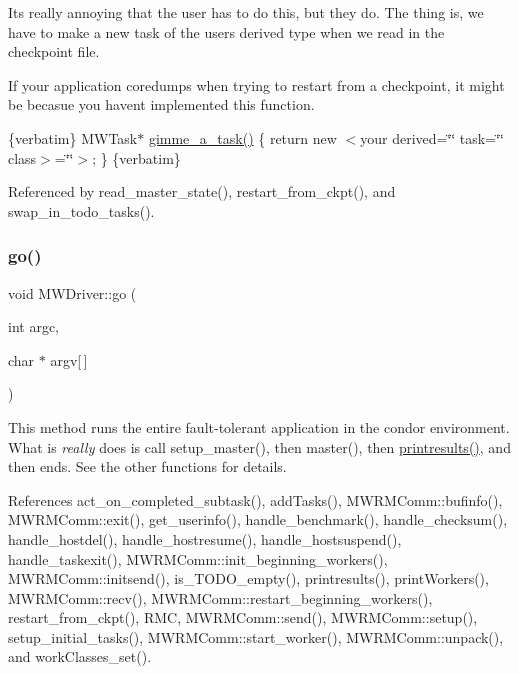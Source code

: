 It\textquotesingle{}s really annoying that the user has to do this, but they do. The thing is, we have to make a new task of the user\textquotesingle{}s derived type when we read in the checkpoint file.

If your application coredumps when trying to restart from a checkpoint, it might be becasue you haven\textquotesingle{}t implemented this function.

\{verbatim\} M\+W\+Task$\ast$ \hyperlink{classMWDriver_a7d37eab370800bcc1fed37bff6c92643}{gimme\+\_\+a\+\_\+task()} \{ return new $<$your derived=\char`\"{}\char`\"{} task=\char`\"{}\char`\"{} class$>$=\char`\"{}\char`\"{}$>$; \} \{verbatim\} 

Referenced by read\+\_\+master\+\_\+state(), restart\+\_\+from\+\_\+ckpt(), and swap\+\_\+in\+\_\+todo\+\_\+tasks().

\mbox{\label{classMWDriver_a7e9140329e1c6a2b4b7f1a0a9a365cab}} 
\subsubsection{\texorpdfstring{go()}{go()}\hspace{0.1cm}{\footnotesize\ttfamily [1/2]}}
{\footnotesize\ttfamily void M\+W\+Driver\+::go (\begin{DoxyParamCaption}\item[{int}]{argc,  }\item[{char $\ast$}]{argv\mbox{[}$\,$\mbox{]} }\end{DoxyParamCaption})}

This method runs the entire fault-\/tolerant application in the condor environment. What is {\itshape really} does is call setup\+\_\+master(), then master(), then \hyperlink{classMWDriver_a147074c64c2bf0883077a28432816947}{printresults()}, and then ends. See the other functions for details. 

References act\+\_\+on\+\_\+completed\+\_\+subtask(), add\+Tasks(), M\+W\+R\+M\+Comm\+::bufinfo(), M\+W\+R\+M\+Comm\+::exit(), get\+\_\+userinfo(), handle\+\_\+benchmark(), handle\+\_\+checksum(), handle\+\_\+hostdel(), handle\+\_\+hostresume(), handle\+\_\+hostsuspend(), handle\+\_\+taskexit(), M\+W\+R\+M\+Comm\+::init\+\_\+beginning\+\_\+workers(), M\+W\+R\+M\+Comm\+::initsend(), is\+\_\+\+T\+O\+D\+O\+\_\+empty(), printresults(), print\+Workers(), M\+W\+R\+M\+Comm\+::recv(), M\+W\+R\+M\+Comm\+::restart\+\_\+beginning\+\_\+workers(), restart\+\_\+from\+\_\+ckpt(), R\+MC, M\+W\+R\+M\+Comm\+::send(), M\+W\+R\+M\+Comm\+::setup(), setup\+\_\+initial\+\_\+tasks(), M\+W\+R\+M\+Comm\+::start\+\_\+worker(), M\+W\+R\+M\+Comm\+::unpack(), and work\+Classes\+\_\+set().

